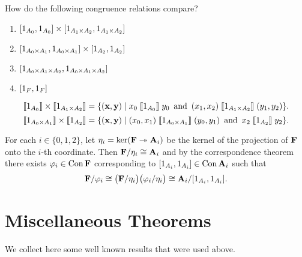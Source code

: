 \medskip

 How do the following congruence relations compare?
\begin{enumerate}
\item $[1_{A_0}, 1_{A_0}] \times [1_{A_1\times A_2}, 1_{A_1\times A_2}]$
\item $[1_{A_0\times A_1}, 1_{A_0\times A_1}] \times [1_{A_2}, 1_{A_2}]$
\item $[1_{A_0\times A_1\times A_2}, 1_{A_0\times A_1\times A_2}]$
\item $[1_F, 1_F]$
\end{enumerate}
\[
\llbracket 1_{A_0} \rrbracket \times \llbracket 1_{A_1\times A_2} \rrbracket = 
\{(\mathbf{x}, \mathbf{y}) \mid x_0 \mathrel{\llbracket 1_{A_0} \rrbracket} y_0 \, \text{ and } \, 
(x_1, x_2) \mathrel{\llbracket 1_{A_1\times A_2} \rrbracket} (y_1, y_2)\}.
\]
\[
\llbracket 1_{A_0\times A_1} \rrbracket \times\llbracket 1_{A_2} \rrbracket = 
\{(\mathbf{x}, \mathbf{y}) \mid  
(x_0, x_1) \mathrel{\llbracket 1_{A_0\times A_1} \rrbracket} (y_0, y_1)\, \text{ and } \, x_2 \mathrel{\llbracket 1_{A_2} \rrbracket} y_2 
\}.
\]
\bigskip

\bigskip



\renewcommand{\phi}{\ensuremath{\varphi}}
For each $i\in \{0,1,2\}$, let $\eta_i = \ker(\mathbf{F} \twoheadrightarrow \mathbf{A}_i)$ be the kernel of
the projection of $\mathbf{F}$ onto the $i$-th coordinate.  Then
$\mathbf{F}/\eta_i \cong \mathbf{A}_i$ and by the correspondence theorem there exists
$\phi_i\in \Con\bF$ corresponding to $[1_{A_i}, 1_{A_i}] \in \operatorname{Con} \mathbf{A}_i$
such that 
\[
\bF/\phi_i \cong
\bigl(\bF/\etaR_i\bigr)\bigl(\phi_i/\etaR_i\bigr)
\cong \bA_i/\com{1_{A_i}}.
\]

\vfill




\appendix

\section{Miscellaneous Theorems}
We collect here some well known results that were used above.

